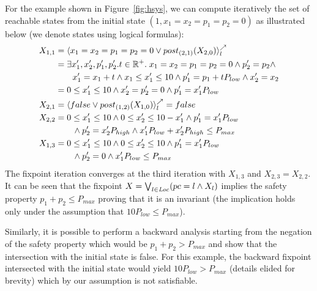 For the example shown in Figure~\ref{fig:hsys}, we can compute iteratively the set of reachable states from 
the initial state $(1,x_1=x_2=p_1=p_2=0)$ as illustrated below (we denote states using logical formulas):
%
\begin{align*}
X_{1,1} & = \langle x_1=x_2=p_1=p_2=0 \vee post_{(2,1)}(X_{2,0}) \rangle^{\nearrow}_{l} \\
		& = \exists x_1',x_2',p_1',p_2'. t \in \mathbb{R}^+. \; x_1=x_2=p_1=p_2=0 \wedge p_2' = p_2 \wedge \\
		& \qquad x_1' = x_1 + t \wedge x_1 \le x_1' \le 10 \wedge p_1' = p_1 + t P_{low} \wedge x_2' = x_2\\
		& = 0 \le x_1' \le 10 \wedge x_2' = p_2' = 0 \wedge p_1' = x_1' P_{low} \\
X_{2,1} &= \langle false \vee post_{(1,2)}(X_{1,0}) \rangle^{\nearrow}_{l} = false  \\
X_{2,2} & = 0 \le x_1' \le 10 \wedge 0 \le x_2' \le 10 - x_1' \wedge p_1' = x_1'P_{low}  \\
		& \qquad \wedge p_2' = x_2' P_{high} \wedge x_1'P_{low} + x_2'P_{high} \le P_{max} \\
X_{1,3} & = 0 \le x_1' \le 10 \wedge 0 \le x_2' \le 10 \wedge p_1' = x_1'P_{low}  \\
		& \qquad \wedge p_2' = 0 \wedge x_1'P_{low} \le P_{max}
\end{align*}
%
The fixpoint iteration converges at the third iteration with $X_{1,3}$ and $X_{2,3} = X_{2,2}$. 
It can be seen that the fixpoint $X = \bigvee_{l \in \mathit{Loc}} (pc = l \wedge X_l)$ implies the 
safety property $p_1 + p_2 \le P_{max}$ proving that it is an invariant (the implication holds
only under the assumption that $10P_{low} \le P_{max}$).

Similarly, it is possible to perform a backward analysis starting from the negation of the safety property
which would be $p_1 + p_2 > P_{max}$ and show that the intersection with the initial state is false.
For this example, the backward fixpoint intersected with the initial state would yield $10 P_{low} > P_{max}$
(details elided for brevity) which by our assumption is not satisfiable.


